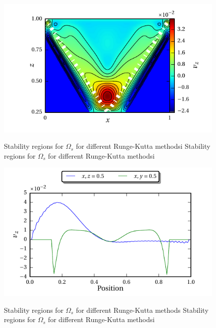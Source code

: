 
\begin{figure}[!tp]
  \begin{minipage}[c]{0.6\textwidth}
      \includegraphics{gfx/cone/experiment/contour.pdf}\label{fig:mask_vp}
  \end{minipage}\hfill
  \begin{minipage}[c]{0.3\textwidth}
  \caption{Stability regions for $\Omega_s$ for different Runge-Kutta methodsi
    Stability regions for $\Omega_s$ for different Runge-Kutta methodsi
  }
  \label{fig:num_rkstab}
  \end{minipage}
\end{figure}

\begin{figure}[!tp]
  \begin{minipage}[c]{0.3\textwidth}
  \caption{Stability regions for $\Omega_s$ for different Runge-Kutta methods
  Stability regions for $\Omega_s$ for different Runge-Kutta methodsi
  }
  \label{fig:num_rkstab}
  \end{minipage}
  \hfill
  \begin{minipage}[c]{0.6\textwidth}
      \includegraphics{gfx/cone/experiment/error.pdf}\label{fig:mask_vp}
  \end{minipage}
\end{figure}

